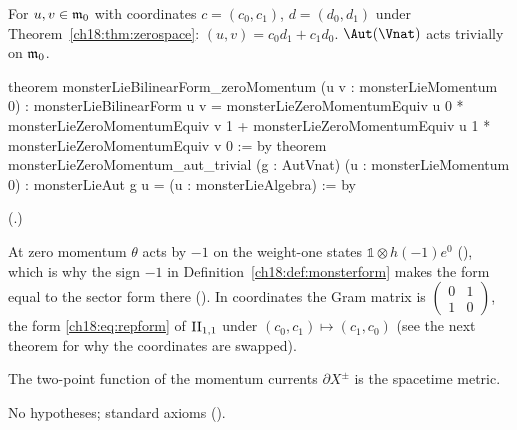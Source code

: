 \begin{theorem}\label{ch18:thm:zeroform}
For $u,v\in\mathfrak{m}_0$ with coordinates $c=(c_0,c_1)$, $d=(d_0,d_1)$ under Theorem~\ref{ch18:thm:zerospace}:
$(u,v)=c_0d_1+c_1d_0$.  $\Aut(\Vnat)$ acts trivially on $\mathfrak{m}_0$.
\end{theorem}
\begin{leancode}
theorem monsterLieBilinearForm_zeroMomentum (u v : monsterLieMomentum 0) :
    monsterLieBilinearForm u v =
      monsterLieZeroMomentumEquiv u 0 * monsterLieZeroMomentumEquiv v 1 +
      monsterLieZeroMomentumEquiv u 1 * monsterLieZeroMomentumEquiv v 0 := by
theorem monsterLieZeroMomentum_aut_trivial (g : AutVnat) (u : monsterLieMomentum 0) :
    monsterLieAut g u = (u : monsterLieAlgebra) := by
\end{leancode}
(.)
\begin{dictionary}
At zero momentum $\theta$ acts by $-1$ on the weight-one states $\mathbb 1\otimes h(-1)e^0$
(), which is why the sign $-1$ in Definition~\ref{ch18:def:monsterform} makes the
form equal to the sector form there ().  In coordinates the Gram matrix is
$\left(\begin{smallmatrix}0&1\\1&0\end{smallmatrix}\right)$, the form \eqref{ch18:eq:repform} of $\mathrm{II}_{1,1}$ under
$(c_0,c_1)\mapsto(c_1,c_0)$ (see the next theorem for why the coordinates are swapped).
\end{dictionary}
\begin{physics}The two-point function of the momentum currents $\partial X^\pm$ is the spacetime metric.\end{physics}
\begin{status}No hypotheses; standard axioms ().\end{status}

